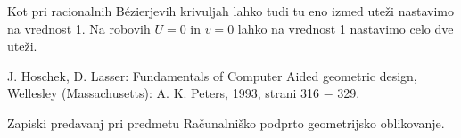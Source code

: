 \documentclass[a4paper,10pt]{article}
\begin{document}
Kot pri racionalnih Bézierjevih krivuljah lahko tudi tu eno izmed uteži nastavimo na vrednost 1. Na robovih $U=0$ in $v=0$ lahko na vrednost 1 nastavimo celo dve uteži.


\begin{thebibliography}{9}
    J. Hoschek, D. Lasser: Fundamentals of Computer Aided geometric design,
    Wellesley (Massachusetts): A. K. Peters, 1993, strani 316 $-$ 329.

    Zapiski predavanj pri predmetu Računalniško podprto geometrijsko oblikovanje.
\end{thebibliography}
\end{document}
